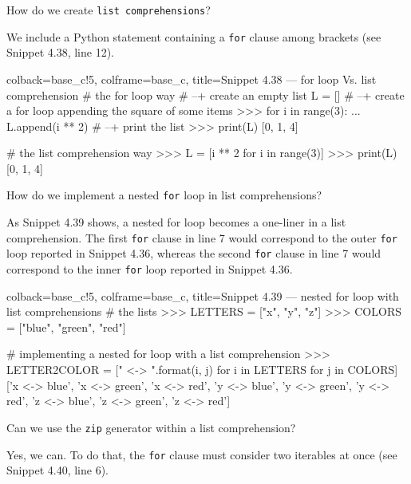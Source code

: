 \documentclass[a4paper,11pt]{book}
\numberwithin{figure}{chapter}
\numberwithin{table}{chapter}
\newcommand{\question}[1]{%
    \begin{tcolorbox}[colback=comp_c!10,colframe=comp_c,sidebyside align=top,width=\linewidth,before skip=1ex]
        #1
    \end{tcolorbox}
    \switchcolumn%
}
\newcommand{\note}[1]{%
    \begin{tcolorbox}[colback=white!0,colframe=white!10,width=\linewidth,before skip=1ex]
        #1
    \end{tcolorbox}
}
\begin{document}
\begin{paracol}{2}
	\question{\raggedright How do we create \texttt{list comprehensions}?}
	\note{We include a Python statement containing a \texttt{for} clause among brackets (see Snippet 4.38, line 12).}
\end{paracol}
\clearpage

\begin{pythoncode}[linenos=true,]{colback=base_c!5, colframe=base_c, title=\sffamily Snippet 4.38 --- for loop Vs. list comprehension}
# the for loop way
# --+ create an empty list
L = []
# --+ create a for loop appending the square of some items
>>> for i in range(3):
...    L.append(i ** 2)
# --+ print the list
>>> print(L)
[0, 1, 4]

# the list comprehension way
>>> L = [i ** 2 for i in range(3)]
>>> print(L)
[0, 1, 4]

\end{pythoncode}

\begin{paracol}{2}
	\question{\raggedright How do we implement a nested \texttt{for} loop in list comprehensions?}
	\note{As Snippet 4.39 shows, a nested for loop becomes a one-liner in a list comprehension. The first \texttt{for} clause in line 7 would correspond to the outer \texttt{for} loop reported in Snippet 4.36, whereas the second \texttt{for} clause in line 7 would correspond to the inner \texttt{for} loop reported in Snippet 4.36.}
\end{paracol}

\begin{pythoncode}[linenos=true,]{colback=base_c!5, colframe=base_c, title=\sffamily Snippet 4.39 --- nested for loop with list comprehensions}
# the lists 
>>> LETTERS = ["x", "y", "z"]
>>> COLORS = ["blue", "green", "red"]

# implementing a nested for loop with a list comprehension
>>> LETTER2COLOR = ["{} <-> {}".format(i, j) for i in LETTERS for j in COLORS]
['x <-> blue',
 'x <-> green',
 'x <-> red',
 'y <-> blue',
 'y <-> green',
 'y <-> red',
 'z <-> blue',
 'z <-> green',
 'z <-> red']
\end{pythoncode}

\begin{paracol}{2}
	\question{\raggedright Can we use the \texttt{zip} generator within a list comprehension?}
	\note{Yes, we can. To do that, the \texttt{for} clause must consider two iterables at once (see Snippet 4.40, line 6).}
\end{paracol}
\clearpage
\end{document}

